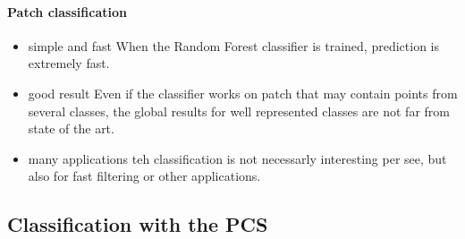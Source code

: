 			\paragraph{Patch classification}
			\begin{itemize}
				\item simple and fast
					When the Random Forest classifier is trained, prediction is extremely fast.
				\item good result
					Even if the classifier works on patch that may contain points from several classes, the global results for well represented classes are not far from state of the art.
				\item many applications
					teh classification is not necessarly interesting per see, but also for fast filtering or other applications.
			\end{itemize}
			
		
	\subsection{Classification with the PCS}
		\label{method.classif}
		
